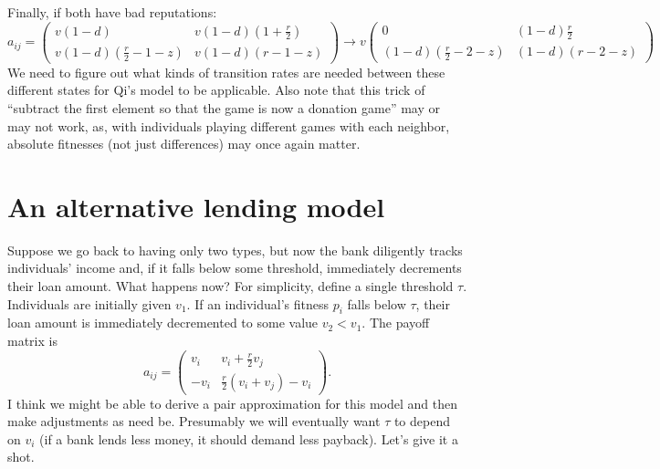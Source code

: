\documentclass[13pt]{amsart}
\begin{document}
Finally, if both have bad reputations:
\begin{equation}
    a_{ij} =
    \begin{pmatrix}
        v(1-d) & v(1-d)(1+\frac{r}{2}) \\
        v(1-d)(\frac{r}{2} - 1 - z) & v(1-d)(r - 1 - z)
    \end{pmatrix}
    \to
    v\begin{pmatrix}
        0 & (1-d)\frac{r}{2} \\
        (1-d)(\frac{r}{2} - 2 - z) & (1-d)(r - 2 - z)
    \end{pmatrix}
\end{equation}
We need to figure out what kinds of transition rates are needed between these different states for Qi's model to be applicable.
Also note that this trick of ``subtract the first element so that the game is now a donation game'' may or may not work, as, with individuals playing different games with each neighbor, absolute fitnesses (not just differences) may once again matter.

\section{An alternative lending model}

Suppose we go back to having only two types, but now the bank diligently tracks individuals' income and, if it falls below some threshold, immediately decrements their loan amount.
What happens now?
For simplicity, define a single threshold $\tau$.
Individuals are initially given $v_1$.
If an individual's fitness $p_i$ falls below $\tau$, their loan amount is immediately decremented to some value $v_2 < v_1$.
The payoff matrix is
\begin{equation}
    a_{ij} =
    \begin{pmatrix}
        v_i & v_i + \frac{r}{2} v_j \\
        -v_i & \frac{r}{2}(v_i + v_j) - v_i
    \end{pmatrix}.
\end{equation}
I think we might be able to derive a pair approximation for this model and then make adjustments as need be.
Presumably we will eventually want $\tau$ to depend on $v_i$ (if a bank lends less money, it should demand less payback).
Let's give it a shot.
\end{document}
